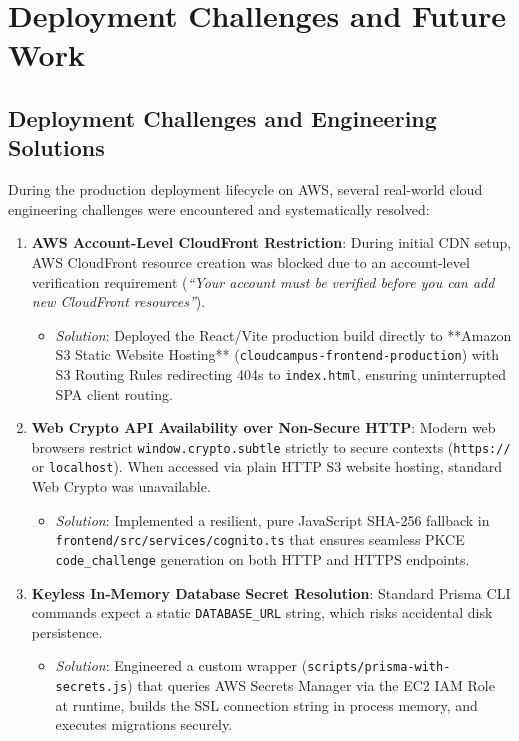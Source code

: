 \newpage
\section{Deployment Challenges and Future Work}

\subsection{Deployment Challenges and Engineering Solutions}
During the production deployment lifecycle on AWS, several real-world cloud engineering challenges were encountered and systematically resolved:

\begin{enumerate}[leftmargin=*,itemsep=1pt]
    \item \textbf{AWS Account-Level CloudFront Restriction}: During initial CDN setup, AWS CloudFront resource creation was blocked due to an account-level verification requirement (\textit{``Your account must be verified before you can add new CloudFront resources''}).
    \begin{itemize}[itemsep=1pt]
        \item \textit{Solution}: Deployed the React/Vite production build directly to **Amazon S3 Static Website Hosting** (\texttt{cloudcampus-frontend-production}) with S3 Routing Rules redirecting 404s to \texttt{index.html}, ensuring uninterrupted SPA client routing.
    \end{itemize}
    \item \textbf{Web Crypto API Availability over Non-Secure HTTP}: Modern web browsers restrict \texttt{window.crypto.subtle} strictly to secure contexts (\texttt{https://} or \texttt{localhost}). When accessed via plain HTTP S3 website hosting, standard Web Crypto was unavailable.
    \begin{itemize}[itemsep=1pt]
        \item \textit{Solution}: Implemented a resilient, pure JavaScript SHA-256 fallback in \texttt{frontend/src/services/cognito.ts} that ensures seamless PKCE \texttt{code\_challenge} generation on both HTTP and HTTPS endpoints.
    \end{itemize}
    \item \textbf{Keyless In-Memory Database Secret Resolution}: Standard Prisma CLI commands expect a static \texttt{DATABASE\_URL} string, which risks accidental disk persistence.
    \begin{itemize}[itemsep=1pt]
        \item \textit{Solution}: Engineered a custom wrapper (\texttt{scripts/prisma-with-secrets.js}) that queries AWS Secrets Manager via the EC2 IAM Role at runtime, builds the SSL connection string in process memory, and executes migrations securely.
    \end{itemize}
\end{enumerate}

